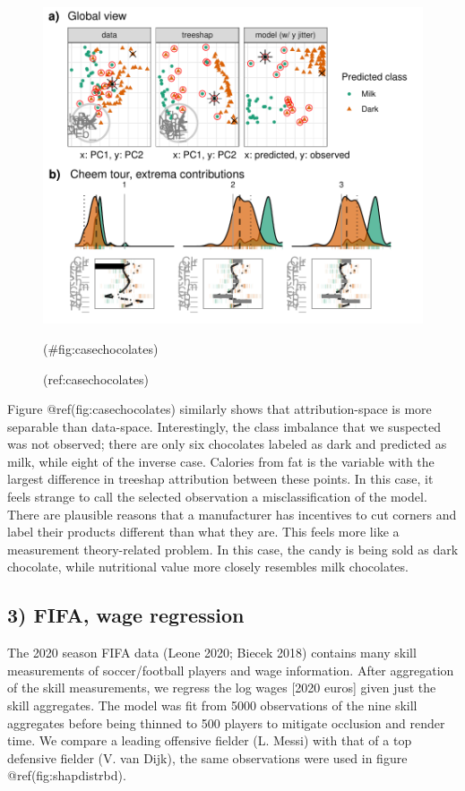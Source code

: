 \documentclass[
]{article}
\begin{document}
\begin{figure}

{\centering \includegraphics[width=1\linewidth]{./figures/case_chocolates} 

}

\caption{(ref:casechocolates)}(\#fig:casechocolates)
\end{figure}

Figure @ref(fig:casechocolates) similarly shows that attribution-space
is more separable than data-space. Interestingly, the class imbalance
that we suspected was not observed; there are only six chocolates
labeled as dark and predicted as milk, while eight of the inverse case.
Calories from fat is the variable with the largest difference in
treeshap attribution between these points. In this case, it feels
strange to call the selected observation a misclassification of the
model. There are plausible reasons that a manufacturer has incentives to
cut corners and label their products different than what they are. This
feels more like a measurement theory-related problem. In this case, the
candy is being sold as dark chocolate, while nutritional value more
closely resembles milk chocolates.

\hypertarget{fifa-wage-regression}{%
\subsection{3) FIFA, wage regression}\label{fifa-wage-regression}}

The 2020 season FIFA data (Leone 2020; Biecek 2018) contains many skill
measurements of soccer/football players and wage information. After
aggregation of the skill measurements, we regress the log wages {[}2020
euros{]} given just the skill aggregates. The model was fit from 5000
observations of the nine skill aggregates before being thinned to 500
players to mitigate occlusion and render time. We compare a leading
offensive fielder (L. Messi) with that of a top defensive fielder (V.
van Dijk), the same observations were used in figure
@ref(fig:shapdistrbd).
\end{document}
